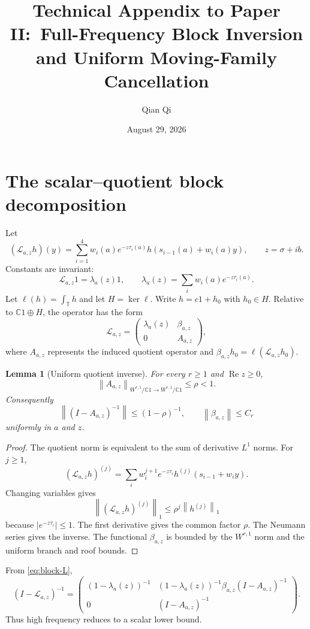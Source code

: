 \documentclass[11pt,reqno]{amsart}
\title{Technical Appendix to Paper II:\ Full-Frequency Block Inversion and Uniform Moving-Family Cancellation}
\author{Qian Qi}
\date{August 29, 2026}
\newtheorem{lemma}[theorem]{Lemma}
\theoremstyle{definition}
\theoremstyle{remark}
\newcommand{\C}{\mathbb C}
\newcommand{\T}{\mathbb T}
\newcommand{\norm}[1]{\left\lVert#1\right\rVert}
\newcommand{\abs}[1]{\left\lvert#1\right\rvert}
\begin{document}
\maketitle

\section{The scalar--quotient block decomposition}

Let
\[
 (\mathcal L_{a,z}h)(y)=
 \sum_{i=1}^4w_i(a)e^{-z\tau_i(a)}
 h(s_{i-1}(a)+w_i(a)y),
 \qquad z=\sigma+ib.
\]
Constants are invariant:
\[
 \mathcal L_{a,z}1=\lambda_a(z)1,
 \qquad
 \lambda_a(z)=\sum_iw_i(a)e^{-z\tau_i(a)}.
\]
Let $\ell(h)=\int_\T h$ and let $H=\ker\ell$.  Write
$h=c1+h_0$ with $h_0\in H$.  Relative to
$\C1\oplus H$, the operator has the form
\begin{equation}\label{eq:block-L}
 \mathcal L_{a,z}=
 \begin{pmatrix}
 \lambda_a(z)&\beta_{a,z}\\
 0&A_{a,z}
 \end{pmatrix},
\end{equation}
where $A_{a,z}$ represents the induced quotient operator and
$\beta_{a,z}h_0=\ell(\mathcal L_{a,z}h_0)$.

\begin{lemma}[Uniform quotient inverse]\label{lem:quotient-inverse}
For every $r\ge1$ and $\operatorname{Re}z\ge0$,
\[
 \norm{A_{a,z}}_{W^{r,1}/\C1\to W^{r,1}/\C1}\le\rho<1.
\]
Consequently
\[
 \norm{(I-A_{a,z})^{-1}}\le(1-\rho)^{-1},
 \qquad
 \norm{\beta_{a,z}}\le C_r
\]
uniformly in $a$ and $z$.
\end{lemma}

\begin{proof}
The quotient norm is equivalent to the sum of derivative $L^1$ norms.  For
$j\ge1$,
\[
 (\mathcal L_{a,z}h)^{(j)}=
 \sum_iw_i^{j+1}e^{-z\tau_i}h^{(j)}(s_{i-1}+w_i y).
\]
Changing variables gives
\[
 \norm{(\mathcal L_{a,z}h)^{(j)}}_1
 \le\rho^j\norm{h^{(j)}}_1
\]
because $\abs{e^{-z\tau_i}}\le1$.  The first derivative gives the common
factor $\rho$.  The Neumann series gives the inverse.  The functional
$\beta_{a,z}$ is bounded by the $W^{r,1}$ norm and the uniform branch and roof
bounds.
\end{proof}

From \eqref{eq:block-L},
\begin{equation}\label{eq:block-inverse}
 (I-\mathcal L_{a,z})^{-1}=
 \begin{pmatrix}
 (1-\lambda_a(z))^{-1}&
 (1-\lambda_a(z))^{-1}\beta_{a,z}(I-A_{a,z})^{-1}\\
 0&(I-A_{a,z})^{-1}
 \end{pmatrix}.
\end{equation}
Thus high frequency reduces to a scalar lower bound.
\end{document}
